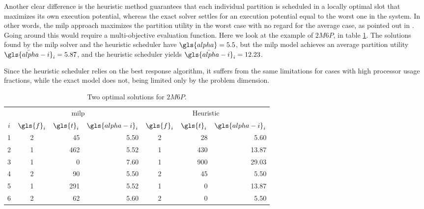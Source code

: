 \documentclass[main.tex]{subfiles}
\begin{document}
Another clear difference is the heuristic method guarantees that each individual partition is scheduled in a locally optimal slot that maximizes its own execution potential, whereas the exact solver settles for an execution potential equal to the worst one in the system.
In other words, the \gls{milp} approach maximizes the partition utility in the worst case with no regard for the average case, as pointed out in \textcite{al2012strictly}.
Going around this would require a multi-objective evaluation function.
Here we look at the example of $2M6P$, in table \ref{tab:solution2M6P}.
The solutions found by the \gls{milp} solver and the heuristic scheduler have $\gls{alpha}=5.5$, but the \gls{milp} model achieves an average partition utility $\bar{\gls{alpha-i}}_i=5.87$, and the heuristic scheduler yields $\bar{\gls{alpha-i}}_i=12.23$.

Since the heuristic scheduler relies on the best response algorithm, it suffers from the same limitations for cases with high processor usage fractions, while the exact model does not, being limited only by the problem dimension.

\begin{table}[htbp]
    \centering
    \caption{Two optimal solutions for $2M6P$.}
    \label{tab:solution2M6P}
    \begin{tabular}{c|crr|crr}
        \toprule
        & \multicolumn{3}{c}{\gls{milp}}          & \multicolumn{3}{c}{Heuristic} \\
        $i$ & $\gls{f}_i$ & $\gls{t}_i$ & $\gls{alpha-i}_i$ & $\gls{f}_i$ & $\gls{t}_i$ & $\gls{alpha-i}_i$ \\
        \midrule
        \num{1} & \num{2} & \num{45}  & \num{5.50}  & \num{2} & \num{28}  & \num{5.60}  \\
        \num{2} & \num{1} & \num{462} & \num{5.52}  & \num{1} & \num{430} & \num{13.87} \\
        \num{3} & \num{1} & \num{0}   & \num{7.60}  & \num{1} & \num{900} & \num{29.03} \\
        \num{4} & \num{2} & \num{90}  & \num{5.50}  & \num{2} & \num{45}  & \num{5.50}  \\
        \num{5} & \num{1} & \num{291} & \num{5.52}  & \num{1} & \num{0}   & \num{13.87} \\
        \num{6} & \num{2} & \num{62}  & \num{5.60}  & \num{2} & \num{0}   & \num{5.50}  \\
        \bottomrule
    \end{tabular}
\end{table}
\end{document}
